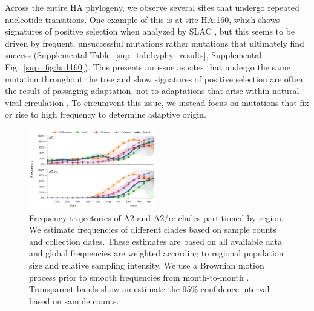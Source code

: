 Across the entire HA phylogeny, we observe several sites that undergo repeated nucleotide transitions.
One example of this is at site HA:160, which shows signatures of positive selection when analyzed by SLAC \citep{pond_2005}, but this seems to be driven by frequent, unsuccessful mutations rather mutations that ultimately find success (Supplemental Table~\ref{sup_tab:hyphy_results}, Supplemental Fig.~\ref{sup_fig:ha1160}).
This presents an issue as sites that undergo the same mutation throughout the tree and show signatures of positive selection are often the result of passaging adaptation, not to adaptations that arise within natural viral circulation \citep{10.1371/journal.ppat.1004940, McWhite2016SequenceAV}.
To circumvent this issue, we instead focus on mutations that fix or rise to high frequency to determine adaptive origin.

\begin{figure}[b]
    \begin{center}
    \includegraphics[width=0.49\textwidth]{figures/h3n2_freq_mutations.png}
    \end{center}
    \caption{Frequency trajectories of A2 and A2/re clades partitioned by region. We estimate frequencies of different clades based on sample counts and collection dates. These estimates are based on all available data and global frequencies are weighted according to regional population size and relative sampling intensity. We use a Brownian motion process prior to smooth frequencies from month-to-month \citep{neher_nextflu_2015}. Transparent bands show an estimate the 95\% confidence interval based on sample counts.}
    \label{fig:frequencies}
\end{figure}

